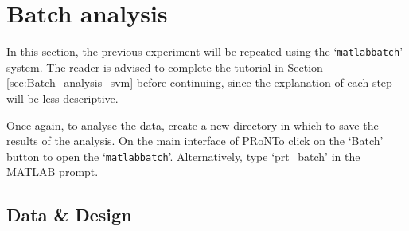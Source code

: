 
\section{Batch analysis}
\label{sec:Batch_analysis_svm_confounds}

In this section, the previous experiment will be repeated using the `\texttt{matlabbatch}' system. The reader is advised to complete the tutorial in Section \ref{sec:Batch_analysis_svm} before continuing, since the explanation of each step will be less descriptive.

Once again, to analyse the data, create a new directory in which to save the results of the analysis. On the main interface of PRoNTo click on the `Batch' button to open the `{\tt matlabbatch}'. Alternatively, type `prt\_batch' in the MATLAB prompt.


\subsection{Data \& Design}

